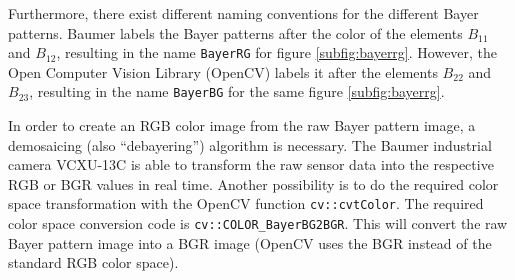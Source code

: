 Furthermore, there exist different naming conventions for the different Bayer patterns.
Baumer labels the Bayer patterns after the color of the elements $B_{11}$ and $B_{12}$, resulting in the name \texttt{BayerRG} for figure \ref{subfig:bayerrg}.
However, the Open Computer Vision Library (OpenCV) labels it after the elements $B_{22}$ and $B_{23}$, resulting in the name \texttt{BayerBG} for the same figure \ref{subfig:bayerrg}.

In order to create an RGB color image from the raw Bayer pattern image, a demosaicing (also ``debayering'') algorithm is necessary.
The Baumer industrial camera VCXU-13C is able to transform the raw sensor data into the respective RGB or BGR values in real time.
Another possibility is to do the required color space transformation with the OpenCV function \texttt{cv::cvtColor}.
The required color space conversion code is \texttt{cv::COLOR\_BayerBG2BGR}.
This will convert the raw Bayer pattern image into a BGR image (OpenCV uses the BGR instead of the standard RGB color space).
